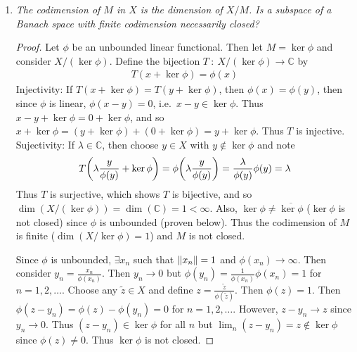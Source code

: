 \documentclass{article} %
\theoremstyle{plain}
\def\Cx{\mathbb{C}}
\numberwithin{equation}{section} %
\numberwithin{figure}{section} %
\numberwithin{table}{section} %
\begin{document}
\begin{enumerate}[\it (a)]
\begin{proof}
            Now choose $x + M \in X/M$.  Then note $P_Nx \in N$ and
            \begin{align*}
                T(P_Nx) = P_Nx + M = (P_Nx + M) + (P_Mx + M) = (P_Nx + P_Mx) + M = x + M
            \end{align*}
            Thus $T$ is surjective.  Thus $T$ is a bijection.  Also, $T$ is a linear map since
            \begin{align*}
                T(\alpha x + \beta y) = (\alpha x + \beta y) + M = \alpha(x + M) + \beta(y + M) = \alpha Tx + \beta Ty
            \end{align*}
            Thus $N$ is linearly isomorphic to $X/M$.
        \end{proof}
    \item
        \emph{The \emph{codimension} of $M$ in $X$ is the dimension of $X/M$.  Is a subspace of a Banach space with finite codimension necessarily closed?}
        \begin{proof}
            Let $\phi$ be an unbounded linear functional.  Then let $M = \ker\phi$ and consider $X/(\ker \phi)$.  Define the bijection $T\ :\ X/(\ker \phi) \rightarrow \Cx$ by
            \begin{align*}
                T(x + \ker \phi) = \phi(x)
            \end{align*}
            Injectivity: If $T(x + \ker\phi) = T(y + \ker\phi)$, then $\phi(x) = \phi(y)$, then since $\phi$ is linear, $\phi(x - y) = 0$, i.e.~$x - y \in \ker \phi$.  Thus $x - y + \ker \phi = 0 + \ker \phi$, and so $x + \ker \phi = (y + \ker \phi) + (0 + \ker \phi) = y + \ker \phi$.  Thus $T$ is injective.  Sujectivity: If $\lambda \in \Cx$, then choose $y \in X$ with $y \not\in \ker\phi$ and note
            \begin{align*}
                T\qty(\lambda\frac{y}{\phi(y)} + \ker \phi) = \phi\qty(\lambda\frac{y}{\phi(y)}) = \frac{\lambda}{\phi(y)}\phi(y) = \lambda
            \end{align*}
            Thus $T$ is surjective, which shows $T$ is bijective, and so $\dim(X/(\ker\phi)) = \dim(\Cx) = 1 < \infty$.  Also, $\ker\phi \neq \overline{\ker\phi}$ ($\ker\phi$ is not closed) since $\phi$ is unbounded (proven below).  Thus the codimension of $M$ is finite ($\dim(X/\ker\phi) = 1$) and $M$ is not closed.

            Since $\phi$ is unbounded, $\exists x_n$ such that $\norm{x_n} = 1$ and $\phi(x_n) \rightarrow \infty$.  Then consider $y_n = \frac{x_n}{\phi(x_n)}$.  Then $y_n \rightarrow 0$ but $\phi(y_n) = \frac{1}{\phi(x_n)}\phi(x_n) = 1$ for $n = 1, 2, \dots$.  Choose any $\tilde{z} \in X$ and define $z = \frac{\tilde{z}}{\phi(\tilde{z})}$.  Then $\phi(z) = 1$.  Then $\phi(z - y_n) = \phi(z) - \phi(y_n) = 0$ for $n = 1, 2, \dots$.  However, $z - y_n \rightarrow z$ since $y_n \rightarrow 0$.  Thus $(z - y_n) \in \ker\phi$ for all $n$ but $\lim_n(z - y_n) = z \not\in\ker\phi$ since $\phi(z) \neq 0$.  Thus $\ker\phi$ is not closed.
        \end{proof}
\end{enumerate}
\end{document}
